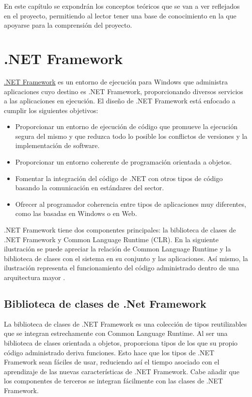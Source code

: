 
En este capítulo se expondrán los conceptos teóricos que se van a ver reflejados en el proyecto, permitiendo al lector tener una base de conocimiento en la que apoyarse para la comprensión del proyecto.

\section{.NET Framework}

\href{https://dotnet.microsoft.com/}{.NET Framework} es un entorno de ejecución para Windows que administra aplicaciones cuyo destino es .NET Framework, proporcionando diversos servicios a las aplicaciones en ejecución. El diseño de .NET Framework está enfocado a cumplir los siguientes objetivos:
\begin{itemize}
	\item Proporcionar un entorno de ejecución de código que promueve la ejecución segura del mismo y que reduzca todo lo posible los conflictos de versiones y la implementación de software.
	\item Proporcionar un entorno coherente de programación orientada a objetos.
	\item Fomentar la integración del código de .NET con otros tipos de código basando la comunicación en estándares del sector.
	\item Ofrecer al programador coherencia entre tipos de aplicaciones muy diferentes, como las basadas en Windows o en Web.
\end{itemize}

.NET Framework tiene dos componentes principales: la biblioteca de clases de .NET Framework y Common Language Runtime (CLR). En la siguiente ilustración se puede apreciar la relación de Common Language Runtime y la biblioteca de clases con el sistema en su conjunto y las aplicaciones. Así mismo, la ilustración representa el funcionamiento del código administrado dentro de una arquitectura mayor \cite{web:docNet}.


\subsection{Biblioteca de clases de .Net Framework}

La biblioteca de clases de .NET Framework es una colección de tipos reutilizables que se integran estrechamente con Common Language Runtime. Al ser una biblioteca de clases orientada a objetos, proporciona tipos de los que su propio código administrado deriva funciones. Esto hace que los tipos de .NET Framework sean fáciles de usar, reduciendo así el tiempo asociado con el aprendizaje de las nuevas características de .NET Framework. Cabe añadir que los componentes de terceros se integran fácilmente con las clases de .NET Framework.

